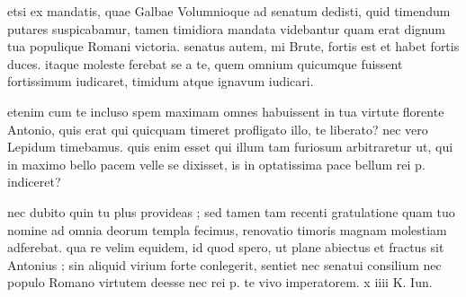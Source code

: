 


 etsi ex mandatis, quae Galbae Volumnioque ad senatum dedisti, quid timendum putares suspicabamur, tamen timidiora mandata videbantur quam erat dignum tua populique Romani victoria. senatus autem, mi Brute, fortis est et habet fortis duces. itaque moleste ferebat se a te, quem omnium quicumque fuissent fortissimum iudicaret, timidum atque ignavum iudicari.

 etenim cum te incluso spem maximam omnes habuissent in tua virtute florente Antonio, quis erat qui quicquam timeret profligato illo, te liberato? nec vero Lepidum timebamus. quis enim esset qui illum tam furiosum arbitraretur ut, qui in maximo bello pacem velle se dixisset, is in optatissima pace bellum rei p. indiceret?

 nec dubito quin tu plus provideas ; sed tamen tam recenti gratulatione quam tuo nomine ad omnia deorum templa fecimus, renovatio timoris magnam molestiam adferebat. qua re velim equidem, id quod spero, ut plane abiectus et fractus sit Antonius ; sin aliquid virium forte conlegerit, sentiet nec senatui consilium nec populo Romano virtutem deesse nec rei p. te vivo imperatorem. x iiii K. Iun.
